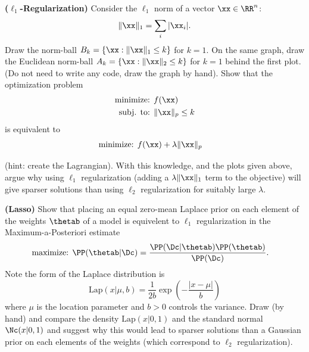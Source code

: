 \documentclass[12pt,letterpaper,fleqn]{hmcpset}
\begin{document}
\begin{problem}[2]
	\textbf{($\ell_1$-Regularization)} Consider the $\ell_1$ norm of a vector $\xx\in\RR^n$:
	\[
		\|\xx\|_1 = \sum_i |\xx_i|.
	\]
	Draw the norm-ball $B_k = \{\xx : \|\xx\|_1 \leq k\}$ for $k=1$. On the same graph, draw the Euclidean norm-ball $A_k = \{\xx : \|\xx\|_2 \leq k\}$ for $k=1$ behind the first plot. (Do not need to write any code, draw the graph by hand).
	\newline
	\newline
	Show that the optimization problem
	\begin{align*}
		\text{minimize: } & f(\xx)           \\
		\text{subj. to: } & \|\xx\|_p \leq k
	\end{align*}
	is equivalent to
	\begin{align*}
		\text{minimize: } & f(\xx) + \lambda\|\xx\|_p
	\end{align*}

	(hint: create the Lagrangian). With this knowledge, and the plots given above, argue why
	using $\ell_1$ regularization (adding a $\lambda\|\xx\|_1$ term to the objective) will give
	sparser solutions than using $\ell_2$ regularization for suitably large $\lambda$.
\end{problem}
\begin{solution}
	\vfill
\end{solution}
\newpage



\begin{problem}
	\textbf{(Lasso)} Show that placing an equal zero-mean Laplace prior on each element of the weights $\thetab$
	of a model is equivelent to $\ell_1$ regularization in the Maximum-a-Posteriori estimate
	\begin{align*}
		\text{maximize: } & \PP(\thetab | \Dc) = \frac{\PP(\Dc | \thetab)\PP(\thetab)}{\PP(\Dc)}.
	\end{align*}
	Note the form of the Laplace distribution is
	\[
		\mathrm{Lap}(x|\mu,b) = \frac{1}{2b}\exp\left(-\frac{|x-\mu|}{b}\right)
	\]
	where $\mu$ is the location parameter and $b>0$ controls the variance. Draw (by hand) and compare the density
	$\mathrm{Lap}(x|0,1)$ and the standard normal $\Nc(x|0,1)$ and suggest why this would
	lead to sparser solutions than a Gaussian prior on each elements of the weights
	(which correspond to $\ell_2$ regularization).
\end{problem}
\begin{solution}
	\vfill
\end{solution}
\end{document}
